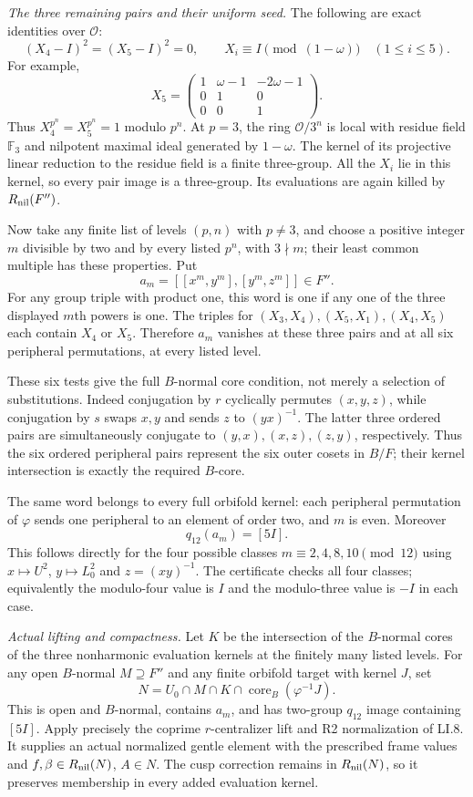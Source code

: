 \emph{The three remaining pairs and their uniform seed.}
The following are exact identities over $\mathcal O$:
\[
 (X_4-I)^2=(X_5-I)^2=0,
 \qquad X_i\equiv I\pmod{(1-\omega)}\quad(1\leq i\leq5).
\]
For example,
\[
 X_5=\begin{pmatrix}
 1&\omega-1&-2\omega-1\\0&1&0\\0&0&1
 \end{pmatrix}.
\]
Thus $X_4^{p^n}=X_5^{p^n}=1$ modulo $p^n$.
At $p=3$, the ring $\mathcal O/3^n$ is local with residue
field $\mathbb F_3$ and nilpotent maximal ideal generated
by $1-\omega$. The kernel of its projective linear
reduction to the residue field is a finite three-group.
All the $X_i$ lie in this kernel, so every pair image is a
three-group. Its evaluations are again killed by
$R_{\rm nil}(F'')$.

Now take any finite list of levels $(p,n)$ with $p\ne3$,
and choose a positive integer $m$ divisible by two and by
every listed $p^n$, with $3\nmid m$; their least common
multiple has these properties. Put
\[
             a_m=[[x^m,y^m],[y^m,z^m]]\in F''.
\]
For any group triple with product one, this word is one
if any one of the three displayed $m$th powers is one.
The triples for $(X_3,X_4),(X_5,X_1),(X_4,X_5)$ each
contain $X_4$ or $X_5$. Therefore $a_m$ vanishes at these
three pairs and at all six peripheral permutations, at
every listed level.

These six tests give the full $B$-normal core condition,
not merely a selection of substitutions. Indeed conjugation
by $r$ cyclically permutes $(x,y,z)$, while conjugation
by $s$ swaps $x,y$ and sends $z$ to $(yx)^{-1}$.
The latter three ordered pairs are simultaneously conjugate
to $(y,x),(x,z),(z,y)$, respectively. Thus the six ordered
peripheral pairs represent the six outer cosets in $B/F$;
their kernel intersection is exactly the required $B$-core.

The same word belongs to every full orbifold kernel:
each peripheral permutation of $\varphi$ sends one peripheral
to an element of order two, and $m$ is even. Moreover
\[
                       q_{12}(a_m)=[5I].
\]
This follows directly for the four possible classes
$m\equiv2,4,8,10\pmod{12}$ using
$x\mapsto U^2$, $y\mapsto L_0^2$ and $z=(xy)^{-1}$.
The certificate checks all four classes; equivalently the
modulo-four value is $I$ and the modulo-three value is
$-I$ in each case.

\emph{Actual lifting and compactness.}
Let $K$ be the intersection of the $B$-normal cores of the
three nonharmonic evaluation kernels at the finitely many
listed levels. For any open $B$-normal $M\supseteq F''$
and any finite orbifold target with kernel $J$, set
\[
 N=U_0\cap M\cap K\cap
                   \operatorname{core}_B(\varphi^{-1}J).
\]
This is open and $B$-normal, contains $a_m$, and has
two-group $q_{12}$ image containing $[5I]$.
Apply precisely the coprime $r$-centralizer lift and R2
normalization of LI.8. It supplies an actual normalized
gentle element with the prescribed frame values and
$f,\beta\in R_{\rm nil}(N)$, $A\in N$.
The cusp correction remains in $R_{\rm nil}(N)$, so
it preserves membership in every added evaluation kernel.

